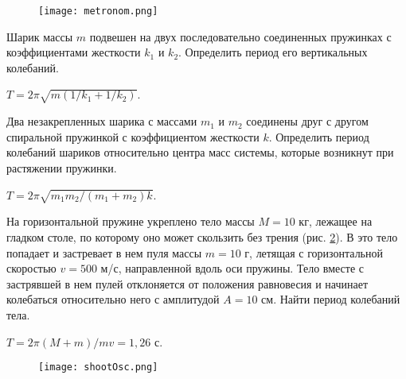 \begin{figure}[h]
\centering
\texttt{[image: metronom.png]}
\caption{}
\label{metronom}
\end{figure}

\begin{ex} %
Шарик массы $m$ подвешен на двух последовательно соединенных пружинках с коэффициентами жесткости $k_1$ и $k_2$. Определить период его вертикальных колебаний.
\begin{ans}
$T = 2 \pi \sqrt{m(1/k_1 + 1/k_2)}$.
\end{ans}
\end{ex}	

\begin{ex} %
Два незакрепленных шарика с массами $m_1$ и $m_2$ соединены друг с другом спиральной пружинкой с коэффициентом жесткости $k$. Определить период колебаний шариков относительно центра масс системы, которые возникнут при растяжении пружинки.
\begin{ans}
$T = 2 \pi \sqrt{m_1m_2/(m_1 + m_2)k}$.
\end{ans}
\end{ex}	

\begin{ex} %
На горизонтальной пружине укреплено тело массы $M = 10$ кг, лежащее на гладком столе, по которому оно может скользить без трения (рис. \ref{shootOsc}). В это тело попадает и застревает в нем пуля массы $m = 10$ г, летящая с горизонтальной скоростью $v = 500$ м/с, направленной вдоль оси пружины. Тело вместе с застрявшей в нем пулей отклоняется от положения равновесия и начинает колебаться относительно него с амплитудой $A = 10$ см. Найти период колебаний тела.
\begin{ans}
$T = 2 \pi (M+m) / mv = 1,26$ с.
\end{ans}
\end{ex}	

\begin{figure}[h]
\centering
\texttt{[image: shootOsc.png]}
\caption{}
\label{shootOsc}
\end{figure}

\clearpage
